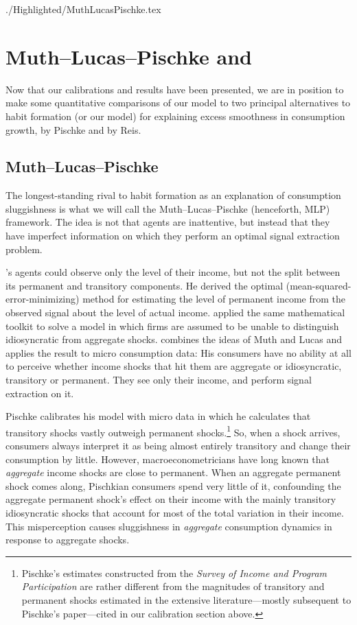 \documentclass[titlepage]{./econtex}
\begin{document}
\hypertarget{MuthLucasPischke}{}
\begin{verbatimwrite}{./Highlighted/MuthLucasPischke.tex}
\section{Muth--Lucas--Pischke and \cite{reis:inattentive}} \label{sec:Comparisons}

Now that our calibrations and results have been presented, we are in position to make some quantitative comparisons of our model to two principal alternatives to habit formation (or our model) for explaining excess smoothness in consumption growth, by Pischke and by Reis.

\subsection{Muth--Lucas--Pischke}
The longest-standing rival to habit formation as an explanation of consumption sluggishness is what we will call the Muth--Lucas--Pischke (henceforth, MLP) framework.  The idea is not that agents are inattentive, but instead that they have imperfect information on which they perform an optimal signal extraction problem.

\cite{muthOptimal}'s agents could observe only the level of their income, but not the split between its permanent and transitory components.  He derived the optimal (mean-squared-error-minimizing) method for estimating the level of permanent income from the observed signal about the level of actual income.  \cite{lucas:imperfectInfo} applied the same mathematical toolkit to solve a model in which firms are assumed to be unable to distinguish idiosyncratic from aggregate shocks.  \cite{pischkeMicroMacro} combines the ideas of Muth and Lucas and applies the result to micro consumption data: His consumers have no ability at all to perceive whether income shocks that hit them are aggregate or idiosyncratic, transitory or permanent.  They see only their income, and perform signal extraction on it.

Pischke calibrates his model with micro data in which he calculates that transitory shocks vastly outweigh permanent shocks.\footnote{Pischke's estimates constructed from the {\it Survey of Income and Program Participation} are rather different from the magnitudes of transitory and permanent shocks estimated in the extensive literature---mostly subsequent to Pischke's paper---cited in our calibration section above.}  So, when a shock arrives, consumers always interpret it as being almost entirely transitory and change their consumption by little.  However, macroeconometricians have long known that {\it aggregate} income shocks are close to permanent.  When an aggregate permanent shock comes along, Pischkian consumers spend very little of it, confounding the aggregate permanent shock's effect on their income with the mainly transitory idiosyncratic shocks that account for most of the total variation in their income.  This misperception causes sluggishness in {\it aggregate} consumption dynamics in response to aggregate shocks.


\end{verbatimwrite}
\end{document}
